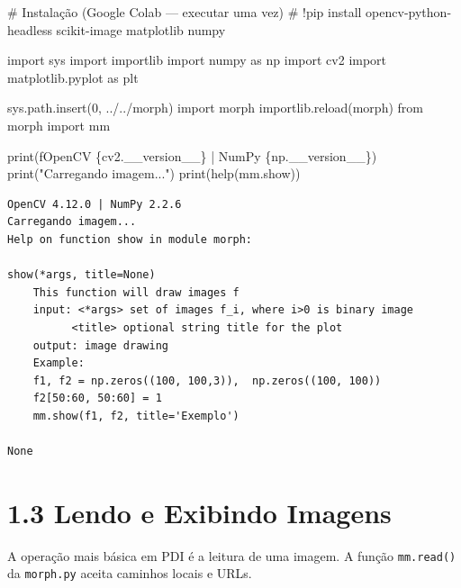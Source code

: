 \documentclass[
  portuguese,
  letterpaper,
  openany,
  oneside,
  12pt,
  a4paper]{book}
\newenvironment{Shaded}{\begin{snugshade}}{\end{snugshade}}
\newcommand{\BuiltInTok}[1]{\textcolor[rgb]{0.00,0.23,0.31}{#1}}
\newcommand{\CommentTok}[1]{\textcolor[rgb]{0.37,0.37,0.37}{#1}}
\newcommand{\DecValTok}[1]{\textcolor[rgb]{0.68,0.00,0.00}{#1}}
\newcommand{\ImportTok}[1]{\textcolor[rgb]{0.00,0.46,0.62}{#1}}
\newcommand{\NormalTok}[1]{\textcolor[rgb]{0.00,0.23,0.31}{#1}}
\newcommand{\SpecialCharTok}[1]{\textcolor[rgb]{0.37,0.37,0.37}{#1}}
\newcommand{\SpecialStringTok}[1]{\textcolor[rgb]{0.13,0.47,0.30}{#1}}
\newcommand{\StringTok}[1]{\textcolor[rgb]{0.13,0.47,0.30}{#1}}
\begin{document}
\begin{tcolorbox}
\begin{Shaded}
\begin{Highlighting}[]
\CommentTok{\# Instalação (Google Colab — executar uma vez)}
\CommentTok{\# !pip install opencv{-}python{-}headless scikit{-}image matplotlib numpy}

\ImportTok{import}\NormalTok{ sys}
\ImportTok{import}\NormalTok{ importlib}
\ImportTok{import}\NormalTok{ numpy }\ImportTok{as}\NormalTok{ np}
\ImportTok{import}\NormalTok{ cv2}
\ImportTok{import}\NormalTok{ matplotlib.pyplot }\ImportTok{as}\NormalTok{ plt}

\NormalTok{sys.path.insert(}\DecValTok{0}\NormalTok{, }\StringTok{\textquotesingle{}../../morph\textquotesingle{}}\NormalTok{)}
\ImportTok{import}\NormalTok{ morph}
\NormalTok{importlib.}\BuiltInTok{reload}\NormalTok{(morph)}
\ImportTok{from}\NormalTok{ morph }\ImportTok{import}\NormalTok{ mm}

\BuiltInTok{print}\NormalTok{(}\SpecialStringTok{f\textquotesingle{}OpenCV }\SpecialCharTok{\{}\NormalTok{cv2}\SpecialCharTok{.}\NormalTok{\_\_version\_\_}\SpecialCharTok{\}}\SpecialStringTok{ | NumPy }\SpecialCharTok{\{}\NormalTok{np}\SpecialCharTok{.}\NormalTok{\_\_version\_\_}\SpecialCharTok{\}}\SpecialStringTok{\textquotesingle{}}\NormalTok{)}
\BuiltInTok{print}\NormalTok{(}\StringTok{"Carregando imagem..."}\NormalTok{)}
\BuiltInTok{print}\NormalTok{(}\BuiltInTok{help}\NormalTok{(mm.show))}
\end{Highlighting}
\end{Shaded}

\begin{verbatim}
OpenCV 4.12.0 | NumPy 2.2.6
Carregando imagem...
Help on function show in module morph:

show(*args, title=None)
    This function will draw images f
    input: <*args> set of images f_i, where i>0 is binary image
          <title> optional string title for the plot
    output: image drawing
    Example:
    f1, f2 = np.zeros((100, 100,3)),  np.zeros((100, 100))
    f2[50:60, 50:60] = 1
    mm.show(f1, f2, title='Exemplo')

None
\end{verbatim}

\section{1.3 Lendo e Exibindo Imagens}\label{lendo-e-exibindo-imagens-1}

A operação mais básica em PDI é a leitura de uma imagem. A função
\texttt{mm.read()} da \texttt{morph.py} aceita caminhos locais e URLs.


\end{tcolorbox}
\end{document}
